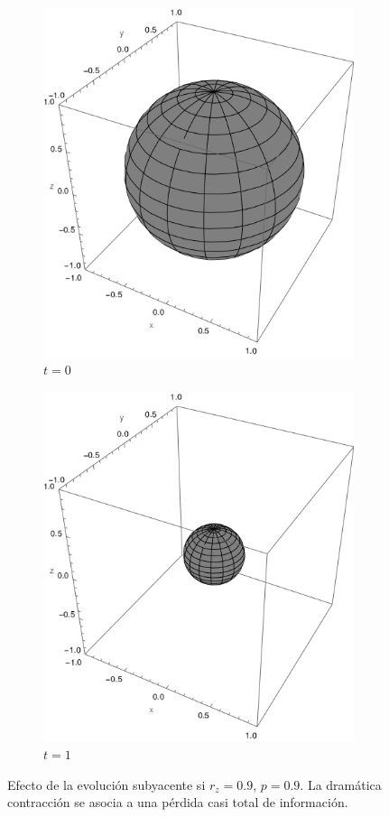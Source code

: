 \begin{figure}[h!]
  \centering
  \begin{subfigure}{0.475\textwidth}
    \centering
    \includegraphics[width=0.6\linewidth]{maxent/figures/sphere_swapcontraction_t=0_z=0.9_p=0.9.png}
    \caption{$t=0$}
  \end{subfigure}%
  \begin{subfigure}{0.475\textwidth}
    \centering
    \includegraphics[width=0.6\linewidth]{maxent/figures/sphere_swapcontraction_t=1_z=0.9_p=0.9.png}
    \caption{$t=1$}
  \end{subfigure}
  \caption{Efecto de la evolución subyacente si $r_{z}=0.9$, $p=0.9$. La dramática contracción se asocia a una pérdida casi total de información.}
  \label{fig:SWAPFactorP}
  \end{figure}


